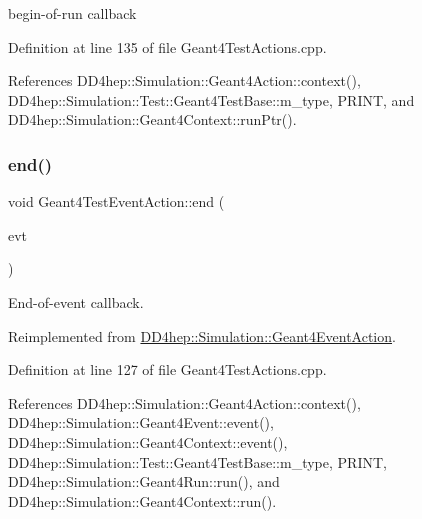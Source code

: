 begin-\/of-\/run callback 



Definition at line 135 of file Geant4\+Test\+Actions.\+cpp.



References D\+D4hep\+::\+Simulation\+::\+Geant4\+Action\+::context(), D\+D4hep\+::\+Simulation\+::\+Test\+::\+Geant4\+Test\+Base\+::m\+\_\+type, P\+R\+I\+NT, and D\+D4hep\+::\+Simulation\+::\+Geant4\+Context\+::run\+Ptr().

\hypertarget{class_d_d4hep_1_1_simulation_1_1_test_1_1_geant4_test_event_action_a1b436d5b8c7b3f9fa93bc2b04946cad3}{}\label{class_d_d4hep_1_1_simulation_1_1_test_1_1_geant4_test_event_action_a1b436d5b8c7b3f9fa93bc2b04946cad3} 
\subsubsection{\texorpdfstring{end()}{end()}}
{\footnotesize\ttfamily void Geant4\+Test\+Event\+Action\+::end (\begin{DoxyParamCaption}\item[{const G4\+Event $\ast$}]{evt }\end{DoxyParamCaption})\hspace{0.3cm}{\ttfamily [virtual]}}



End-\/of-\/event callback. 



Reimplemented from \hyperlink{class_d_d4hep_1_1_simulation_1_1_geant4_event_action_af131bad73c28da3419af7c29e0b8c250}{D\+D4hep\+::\+Simulation\+::\+Geant4\+Event\+Action}.



Definition at line 127 of file Geant4\+Test\+Actions.\+cpp.



References D\+D4hep\+::\+Simulation\+::\+Geant4\+Action\+::context(), D\+D4hep\+::\+Simulation\+::\+Geant4\+Event\+::event(), D\+D4hep\+::\+Simulation\+::\+Geant4\+Context\+::event(), D\+D4hep\+::\+Simulation\+::\+Test\+::\+Geant4\+Test\+Base\+::m\+\_\+type, P\+R\+I\+NT, D\+D4hep\+::\+Simulation\+::\+Geant4\+Run\+::run(), and D\+D4hep\+::\+Simulation\+::\+Geant4\+Context\+::run().

